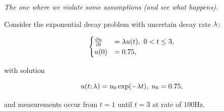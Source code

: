 \begin{frame}{\it The one where we violate some assumptions (and see what happens).}

Consider the exponential decay problem with uncertain decay rate $\lambda$:

\bigskip
$$
\begin{cases}
\frac{\partial u}{\partial t} & = \lambda u(t), \ 0<t\leq 3, \\ u(0) &= 0.75,
\end{cases}
$$

\bigskip
\bigskip
with solution

\begin{equation}
u(t;\lambda) = u_0\exp(-\lambda t), \; u_0 = 0.75 ,
\end{equation}

\bigskip
and measurements occur from $t=1$ until $t=3$ at rate of $100$Hz.
\end{frame}


